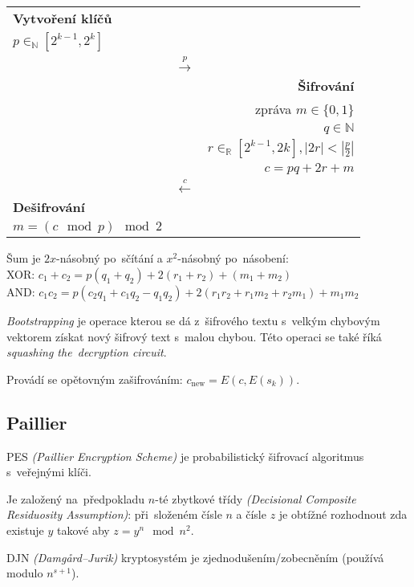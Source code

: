 \begin{table}[ht]
    \centering
    \begin{tabular}{lcr}
    \textbf{Vytvoření klíčů} && \\
    $p \in_\mathbb{N} [2^{k-1}, 2^k]$ \\
    & $\stackrel{p}{\rightarrow}$ & \\
    && \textbf{Šifrování} \\
    && zpráva $m \in \{0,1\}$ \\
    && $q \in \mathbb{N}$ \\
    && $r \in_\mathbb{R} [2^{k-1}, 2k], |2r| < |\frac{p}{2}|$ \\
    && $c = pq + 2r + m$ \\
    & $\stackrel{c}{\leftarrow}$ & \\
    \textbf{Dešifrování} && \\
    $m = (c \mod p) \mod 2$ && \\
    \end{tabular}
\end{table}
\FloatBarrier

Šum je $2x$-násobný po~sčítání a $x^2$-násobný po~násobení:
\\XOR: $c_1 + c_2 = p(q_1 + q_2) + 2(r_1 + r_2) + (m_1 + m_2)$
\\AND: $c_1 c_2 = p(c_2 q_1 + c_1 q_2 - q_1 q_2) + 2(r_1 r_2 + r_1 m_2 + r_2 m_1) + m_1 m_2$


\emph{Bootstrapping} je operace kterou se dá z~šifrového textu s~velkým chybovým vektorem získat nový šifrový text s~malou chybou.
Této operaci se také říká \emph{squashing the~decryption circuit}.

Provádí se opětovným zašifrováním: $c_\text{new} = E(c, E(s_k))$.

\subsection{Paillier}

PES \emph{(Paillier Encryption Scheme)} je probabilistický šifrovací algoritmus s~veřejnými klíči.

Je založený na~předpokladu $n$-té zbytkové třídy \emph{(Decisional Composite Residuosity Assumption)}: při~složeném čísle $n$ a čísle $z$ je obtížné rozhodnout zda existuje $y$ takové aby $z = y^n \mod n^2$.

DJN \emph{(Damgård--Jurik)} kryptosystém je zjednodušením/zobecněním (používá modulo $n^{s+1}$).

